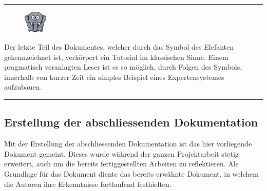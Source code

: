 \noindent\rule[1ex]{\textwidth}{1pt}
\begin{figure}
    \vspace{-18pt}
    \includegraphics[width=0.1\textwidth]{bilder/elephant.png}
\end{figure}
Der letzte Teil des Dokumentes, welcher durch das Symbol des Elefanten gekennzeichnet ist, verkörpert ein Tutorial im klassischen Sinne. Einem pragmatisch veranlagten Leser ist es so möglich, durch Folgen des Symbols, innerhalb von kurzer Zeit ein simples Beispiel eines Expertensystemes aufzubauen.\\
\noindent\rule[1ex]{\textwidth}{1pt}

\subsection{Erstellung der abschliessenden Dokumentation}
\label{subsec:abschliessende_dokumentation}
Mit der Erstellung der abschliessenden Dokumentation ist das hier vorliegende Dokument gemeint. Dieses wurde während der ganzen Projektarbeit stetig erweitert, auch um die bereits fertiggestellten Arbeiten zu reflektieren. Als Grundlage für das Dokument diente das bereits erwähnte Dokument, in welchem die Autoren ihre Erkenntnisse fortlaufend festhielten.
